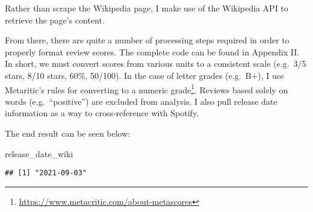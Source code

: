 \documentclass[
  11pt,
]{article}
\newenvironment{Shaded}{\begin{snugshade}}{\end{snugshade}}
\newcommand{\AttributeTok}[1]{\textcolor[rgb]{0.77,0.63,0.00}{#1}}
\newcommand{\CommentTok}[1]{\textcolor[rgb]{0.56,0.35,0.01}{\textit{#1}}}
\newcommand{\DecValTok}[1]{\textcolor[rgb]{0.00,0.00,0.81}{#1}}
\newcommand{\FunctionTok}[1]{\textcolor[rgb]{0.00,0.00,0.00}{#1}}
\newcommand{\NormalTok}[1]{#1}
\newcommand{\OtherTok}[1]{\textcolor[rgb]{0.56,0.35,0.01}{#1}}
\newcommand{\SpecialCharTok}[1]{\textcolor[rgb]{0.00,0.00,0.00}{#1}}
\newcommand{\StringTok}[1]{\textcolor[rgb]{0.31,0.60,0.02}{#1}}
\begin{document}
Rather than scrape the Wikipedia page, I make use of the Wikipedia API
to retrieve the page's content.

\begin{Shaded}
\end{Shaded}

From there, there are quite a number of processing steps required in
order to properly format review scores. The complete code can be found
in Appendix II. In short, we must convert scores from various units to a
consistent scale (e.g.~3/5 stars, 8/10 stars, 60\%, 50/100). In the case
of letter grades (e.g.~B+), I use Metaritic's rules for converting to a
numeric grade\footnote{\url{https://www.metacritic.com/about-metascores}}.
Reviews based solely on words (e.g.~``positive'') are excluded from
analysis. I also pull release date information as a way to
cross-reference with Spotify.

The end result can be seen below:

\begin{Shaded}
\begin{Highlighting}[]
\NormalTok{release\_date\_wiki}
\end{Highlighting}
\end{Shaded}

\begin{verbatim}
## [1] "2021-09-03"
\end{verbatim}
\end{document}

